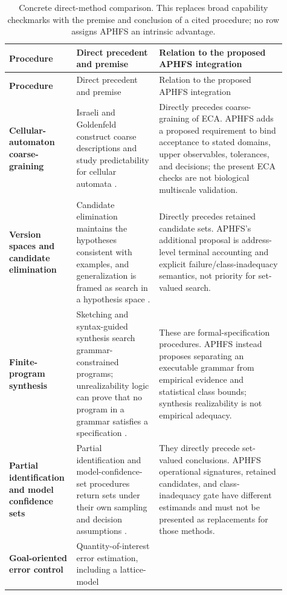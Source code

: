 \begin{longtable}{>{\bfseries}p{0.19\linewidth}p{0.29\linewidth}p{0.43\linewidth}}
\caption{Concrete direct-method comparison. This replaces broad capability checkmarks with the
premise and conclusion of a cited procedure; no row assigns APHFS an intrinsic advantage.}
\label{tab:direct-method-comparison}\\
\toprule
Procedure & Direct precedent and premise & Relation to the proposed APHFS integration \\
\midrule
\endfirsthead
\toprule
Procedure & Direct precedent and premise & Relation to the proposed APHFS integration \\
\midrule
\endhead
Cellular-automaton coarse-graining & Israeli and Goldenfeld construct coarse descriptions and
study predictability for cellular automata \citep{israeli2004,israeli2006}. & Directly precedes
coarse-graining of ECA. APHFS adds a proposed requirement to bind acceptance to stated domains,
upper observables, tolerances, and decisions; the present ECA checks are not biological
multiscale validation.\\
Version spaces and candidate elimination & Candidate elimination maintains the hypotheses
consistent with examples, and generalization is framed as search in a hypothesis space
\citep{mitchell1977candidate,mitchell1982}. & Directly precedes retained candidate sets. APHFS's
additional proposal is address-level terminal accounting and explicit failure/class-inadequacy
semantics, not priority for set-valued search.\\
Finite-program synthesis & Sketching and syntax-guided synthesis search grammar-constrained
programs; unrealizability logic can prove that no program in a grammar satisfies a specification
\citep{solarlezama2006,alur2013sygus,kim2023unrealizability}. & These are formal-specification
procedures. APHFS instead proposes separating an executable grammar from empirical evidence and
statistical class bounds; synthesis realizability is not empirical adequacy.\\
Partial identification and model confidence sets & Partial identification and model-confidence-
set procedures return sets under their own sampling and decision assumptions
\citep{manski2003,hansen2011mcs}. & They directly precede set-valued conclusions. APHFS operational
signatures, retained candidates, and class-inadequacy gate have different estimands and must not be
presented as replacements for those methods.\\
Goal-oriented error control & Quantity-of-interest error estimation, including a lattice-model

\end{longtable}
